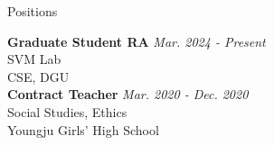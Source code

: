 \begin{rSection}{Positions}

{\bf Graduate Student \acf{RA}} \hfill {\em Mar. 2024 - Present} \\
\acf{SVM} Lab\\
\acf{CSE}, \acf{DGU}\\

{\bf Contract Teacher} \hfill {\em Mar. 2020 - Dec. 2020} \\
Social Studies, Ethics\\
Youngju Girls' High School \\

\end{rSection}
    